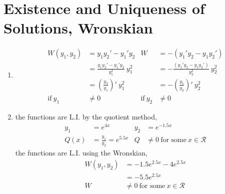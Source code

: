 \section{Existence and Uniqueness of Solutions, Wronskian}

\begin{enumerate}
    \item \begin{align}
              W(y_{1}, y_{2})  & = y_{1}y_{2}' - y_{1}'y_{2}                       &
              W                & = -(y_{1}'y_{2} - y_{1}y_{2}')                      \\
                               & = \frac{y_{1}y_{2}' - y_{1}'y_{2}}{y_{1}^{2}}
              \ y_{1}^{2}      &
                               & = -\frac{(y_{1}'y_{2} - y_{1}y_{2}')}{y_{2}^{2}}
              \ y_{2}^{2}                                                            \\
                               & = \left( \frac{y_{2}}{y_{1}} \right)'\ y_{1}^{2}  &
                               & = -\left( \frac{y_{1}}{y_{2}} \right)'\ y_{2}^{2}   \\
              \text{if}\ y_{1} & \neq 0                                            &
              \text{if}\ y_{2} & \neq 0
          \end{align}

    \item the functions are L.I. by the quotient method,
          \begin{align}
              y_{1} & = e^{4x}                                   &
              y_{2} & = e^{-1.5x}                                  \\
              Q(x)  & = \frac{y_{1}}{y_{2}} = e^{5.5x}           &
              Q     & \neq 0\ \text{for some}\ x \in \mathcal{R}
          \end{align}
          the functions are L.I. using the Wronskian,
          \begin{align}
              W(y_{1}, y_{2}) & = -1.5e^{2.5x} - 4e^{2.5x}                 \\
                              & = -5.5e^{2.5x}                             \\
              W               & \neq 0\ \text{for some}\ x \in \mathcal{R}
          \end{align}


\end{enumerate}
